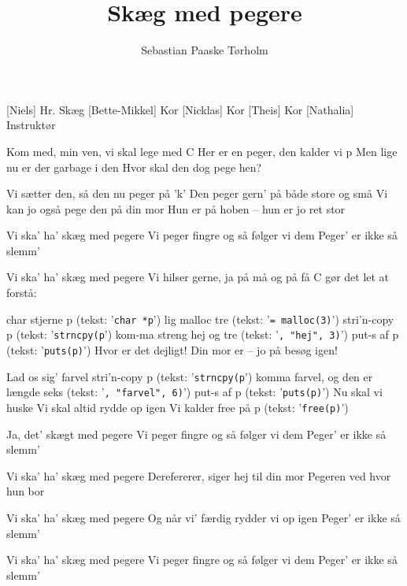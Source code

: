 \documentclass[a4paper,11pt]{article}
\title{Skæg med pegere}
\author{Sebastian Paaske Tørholm}
\begin{document}
\maketitle

\begin{roles}
[Niels] Hr. Skæg
[Bette-Mikkel] Kor
[Nicklas] Kor
[Theis] Kor
[Nathalia] Instruktør
\end{roles}

\begin{song}
%
Kom med, min ven, vi skal lege med C
Her er en peger, den kalder vi p
Men lige nu er der garbage i den
Hvor skal den dog pege hen?

Vi sætter den, så den nu peger på 'k'
Den peger gern' på både store og små
Vi kan jo også pege den på din mor
Hun er på hoben -- hun er jo ret stor

Vi ska' ha' skæg med pegere
Vi peger fingre og så følger vi dem
Peger' er ikke så slemm'

Vi ska' ha' skæg med pegere
Vi hilser gerne, ja på må og på få
C gør det let at forstå:

char stjerne p (tekst: '\texttt{char *p}')
lig malloc tre (tekst: '\texttt{= malloc(3)}') 
stri'n-copy p (tekst: '\texttt{strncpy(p}')
kom-ma streng hej og tre (tekst: '\texttt{, "hej", 3)}') 
put-s af p (tekst: '\texttt{puts(p)}') 
Hvor er det dejligt!
Din mor er -- jo på besøg igen!

Lad os sig' farvel
stri'n-copy p (tekst: '\texttt{strncpy(p}')
komma farvel, og den er længde seks (tekst: '\texttt{, "farvel", 6)}')
put-s af p (tekst: '\texttt{puts(p)}') 
Nu skal vi huske
Vi skal altid rydde op igen
Vi kalder free på p (tekst: '\texttt{free(p)}')

%
Ja, det' skægt med pegere
Vi peger fingre og så følger vi dem
Peger' er ikke så slemm'

Vi ska' ha' skæg med pegere
Derefererer, siger hej til din mor
Pegeren ved hvor hun bor

%
Vi ska' ha' skæg med pegere
Og når vi' færdig rydder vi op igen
Peger' er ikke så slemm'

Vi ska' ha' skæg med pegere
Vi peger fingre og så følger vi dem
Peger' er ikke så slemm'

\end{song}
\end{document}
